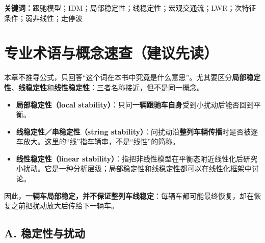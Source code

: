 \documentclass[11pt,a4paper,openany]{book}
\numberwithin{equation}{chapter}
\numberwithin{figure}{chapter}
\numberwithin{table}{chapter}
\begin{document}
\vspace{0.8em}
\noindent\textbf{关键词：}跟驰模型；IDM；局部稳定性；线稳定性；宏观交通流；LWR；次特征条件；弱非线性；走停波
\clearpage

\tableofcontents
\clearpage
{}
{}
\listoffigures
\clearpage
{}
{}
\listoftables
\clearpage

\chapter*{专业术语与概念速查（建议先读）}
\label{sec:glossary}

本章不推导公式，只回答“这个词在本书中究竟是什么意思”。尤其要区分\textbf{局部稳定性}、\textbf{线稳定性}和\textbf{线性稳定性}：三者名称接近，但不是同一概念。

\begin{tcolorbox}[notebox,title=\textbf{最容易混淆的三个“稳定性”}]
\begin{itemize}[leftmargin=1.4em,itemsep=4pt]
\item \textbf{局部稳定性（local stability）}：只问\textbf{一辆跟驰车自身}受到小扰动后能否回到平衡。
\item \textbf{线稳定性／串稳定性（string stability）}：问扰动沿\textbf{整列车辆传播}时是否被逐车放大。这里的“线”指车辆串，不是“线性”的简称。
\item \textbf{线性稳定性（linear stability）}：指把非线性模型在平衡态附近线性化后研究小扰动。它是一种分析层级；局部稳定性和线稳定性都可以在线性化框架中讨论。
\end{itemize}
因此，\textbf{一辆车局部稳定，并不保证整列车线稳定}：每辆车都可能最终恢复，却在恢复之前把扰动放大后传给下一辆车。
\end{tcolorbox}

\section*{A. 稳定性与扰动}
\end{document}
